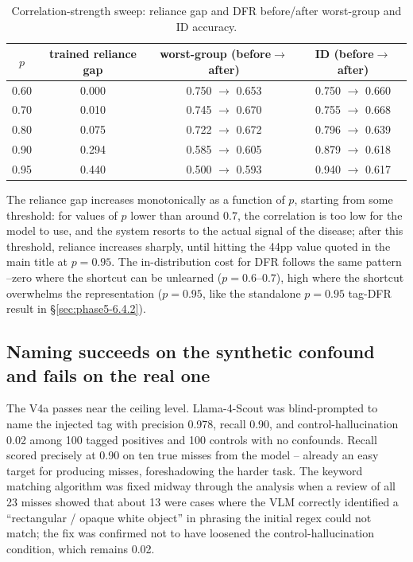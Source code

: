 \documentclass{ieeeaccess}
\begin{document}
\begin{table}[h]
\caption{Correlation-strength sweep: reliance gap and DFR before/after
worst-group and ID accuracy.}
\label{tab:sweep}
\centering
\small
\begin{tabular}{|c|c|c|c|}
\hline
$p$ & trained reliance gap & worst-group (before$\to$after) & ID
(before$\to$after) \\
\hline
0.60 & 0.000 & 0.750 $\to$ 0.653 & 0.750 $\to$ 0.660 \\
0.70 & 0.010 & 0.745 $\to$ 0.670 & 0.755 $\to$ 0.668 \\
0.80 & 0.075 & 0.722 $\to$ 0.672 & 0.796 $\to$ 0.639 \\
0.90 & 0.294 & 0.585 $\to$ 0.605 & 0.879 $\to$ 0.618 \\
0.95 & 0.440 & 0.500 $\to$ 0.593 & 0.940 $\to$ 0.617 \\
\hline
\end{tabular}
\end{table}

The reliance gap increases monotonically as a function of $p$, starting from some threshold:
for values of $p$ lower than around $0.7$, the correlation is too low for the model to use,
and the system resorts to the actual signal of the disease; after this threshold, reliance
increases sharply, until hitting the 44pp value quoted in the main title at $p=0.95$. The in-distribution cost for DFR follows the same pattern  --zero where the shortcut can be unlearned
($p=0.6$--$0.7$), high where the shortcut overwhelms the representation ($p=0.95$, like the
standalone $p=0.95$ tag-DFR  result
in \S\ref{sec:phase5-6.4.2}).

\subsection{Naming succeeds on the synthetic confound and fails on the real one}
The V4a passes near the ceiling level. Llama-4-Scout was blind-prompted to
name the injected tag with precision 0.978, recall 0.90, and
control-hallucination 0.02 among 100 tagged positives and 100 controls with
no confounds. Recall scored precisely at 0.90 on ten true misses from the
model -- already an easy target for producing misses, foreshadowing the
harder task. The keyword matching algorithm was fixed midway through the
analysis when a review of all 23 misses showed that about 13 were cases
where the VLM correctly identified a ``rectangular / opaque white object''
in phrasing the initial regex could not match; the fix was confirmed not
to have loosened the control-hallucination condition, which remains 0.02.
\end{document}
